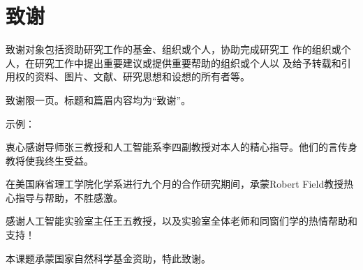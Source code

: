 \chapter{致\quad 谢}

    致谢对象包括资助研究工作的基金、组织或个人，协助完成研究工
    作的组织或个人，在研究工作中提出重要建议或提供重要帮助的组织或个人以
    及给予转载和引用权的资料、图片、文献、研究思想和设想的所有者等。\par
    致谢限一页。标题和篇眉内容均为“致谢”。\par
    示例：\par

    衷心感谢导师张三教授和人工智能系李四副教授对本人的精心指导。他们的言传身教将使我终生受益。\par
    在美国麻省理工学院化学系进行九个月的合作研究期间，承蒙Robert Field教授热心指导与帮助，不胜感激。\par
    感谢人工智能实验室主任王五教授，以及实验室全体老师和同窗们学的热情帮助和支持！\par
    本课题承蒙国家自然科学基金资助，特此致谢。\par




